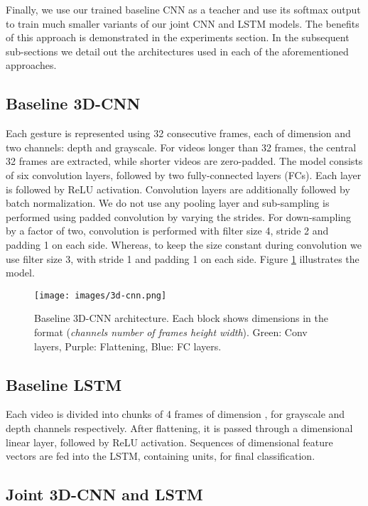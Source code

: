 \documentclass{article}
\begin{document}
Finally, we use our trained baseline CNN as a teacher and use its softmax output to train much smaller variants of our joint CNN and LSTM models. The benefits of this approach is demonstrated in the experiments section. In the subsequent sub-sections we detail out the architectures used in each of the aforementioned approaches.

\subsection{Baseline 3D-CNN}
\label{ssec:cnn}

Each gesture is represented using 32 consecutive frames, each of dimension  and two channels: depth and grayscale. For videos longer than 32 frames, the central 32 frames are extracted, while shorter videos are zero-padded. The model consists of six convolution layers, followed by two fully-connected layers (FCs). Each layer is followed by ReLU activation. Convolution layers are additionally followed by batch normalization. We do not use any pooling layer and sub-sampling is performed using padded convolution by varying the strides. For down-sampling by a factor of two, convolution is performed with filter size 4, stride 2 and padding 1 on each side. Whereas, to keep the size constant during convolution we use filter size 3, with stride 1 and padding 1 on each side. Figure \ref{fig:3dcnn} illustrates the model.

\begin{figure}
  \texttt{[image: images/3d-cnn.png]}
  \caption{Baseline 3D-CNN architecture. Each block shows dimensions in the format (\textit{channels  number of frames  height  width}). Green: Conv layers, Purple: Flattening, Blue: FC layers.}
  \label{fig:3dcnn}
\end{figure}

\subsection{Baseline LSTM}
\label{ssec:lstm}

Each video is divided into chunks of 4 frames of dimension , for grayscale and depth channels respectively. After flattening, it is passed through a  dimensional linear layer, followed by ReLU activation. Sequences of  dimensional feature vectors are fed into the LSTM, containing  units, for final classification.

\subsection{Joint 3D-CNN and LSTM}
\label{ssec:joined}
\end{document}
